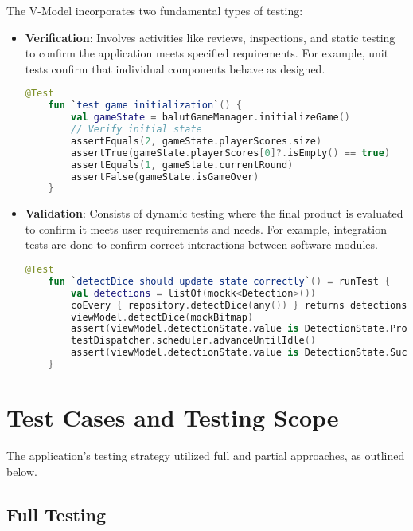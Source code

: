 The V-Model incorporates two fundamental types of testing:
\begin{itemize}
    \item \textbf{Verification}: Involves activities like reviews, inspections, and static testing to confirm the application meets specified requirements. For example, unit tests confirm that individual components behave as designed.
    \begin{lstlisting}[language=Kotlin, caption=Unit Test for Game Initialization, label=lst:unit_game_init]
    @Test
    fun `test game initialization`() {
        val gameState = balutGameManager.initializeGame()   
        // Verify initial state
        assertEquals(2, gameState.playerScores.size)
        assertTrue(gameState.playerScores[0]?.isEmpty() == true)
        assertEquals(1, gameState.currentRound)
        assertFalse(gameState.isGameOver)
    }
    \end{lstlisting}
    \item \textbf{Validation}: Consists of dynamic testing where the final product is evaluated to confirm it meets user requirements and needs. For example, integration tests are done to confirm correct interactions between software modules.
    \begin{lstlisting}[language=Kotlin, caption=Integration Test for Dice Detection, label=lst:integration_dice_detection]
    @Test
    fun `detectDice should update state correctly`() = runTest {
        val detections = listOf(mockk<Detection>())
        coEvery { repository.detectDice(any()) } returns detections
        viewModel.detectDice(mockBitmap)
        assert(viewModel.detectionState.value is DetectionState.Processing)
        testDispatcher.scheduler.advanceUntilIdle()
        assert(viewModel.detectionState.value is DetectionState.Success)
    } 
    \end{lstlisting}
\end{itemize}


\section{Test Cases and Testing Scope}

The application's testing strategy utilized full and partial approaches, as outlined below.

\subsection{Full Testing}

